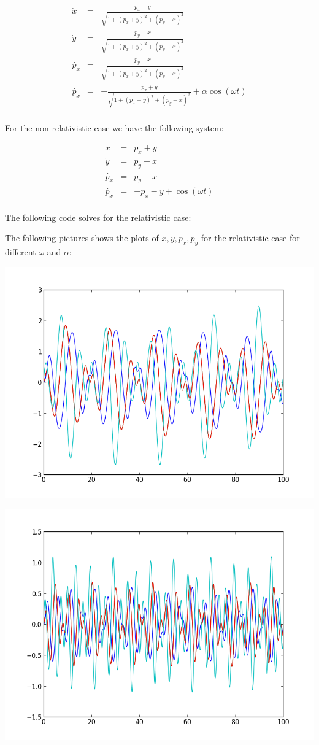 \documentclass[%
]
{scrartcl}
\theoremstyle{plain}
\begin{document}
\begin{eqnarray*}
\dot{x}&=&\frac{p_{x}+y}{\sqrt{1+(p_{x}+y)^{2}+(p_{y}-x)^{2}}}\\
\dot{y}&=&\frac{p_{y}-x}{\sqrt{1+(p_{x}+y)^{2}+(p_{y}-x)^{2}}}\\
\dot{p_{x}}&=&\frac{p_{y}-x}{\sqrt{1+(p_{x}+y)^{2}+(p_{y}-x)^{2}}}\\
\dot{p_{x}}&=&-\frac{p_{x}+y}{\sqrt{1+(p_{x}+y)^{2}+(p_{y}-x)^{2}}}+\alpha\cos(\omega t)
\end{eqnarray*}\\

For the non-relativistic case we have the following system:

\begin{eqnarray*}
\dot{x}&=&p_{x}+y\\
\dot{y}&=&p_{y}-x\\
\dot{p_{x}}&=&p_{y}-x\\
\dot{p_{x}}&=&-p_{x}-y+\cos(\omega t)
\end{eqnarray*}\\

The following code solves for the relativistic case:



The following pictures shows the plots of $x,y,p_{x},p_{y}$ for the relativistic case for different $\omega$ and $\alpha$:

\begin{center}
\centering
\includegraphics[width=0.6\linewidth]{../cyclotronsRelativistic_o1_a1.png}
\end{center}

\begin{center}
\centering
\includegraphics[width=0.6\linewidth]{../cyclotronsRelativistic_o2_a1.png}
\end{center}
\end{document}
